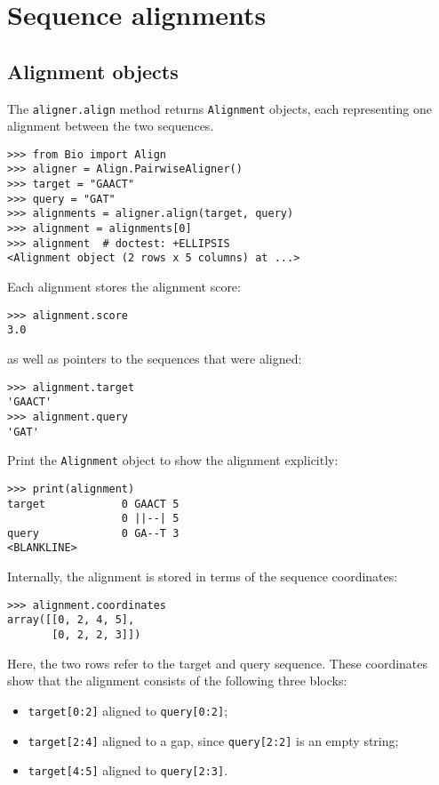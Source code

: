 \chapter{Sequence alignments}
\label{chapter:align}

\section{Alignment objects}
\label{sec:alignmentobject}

The \verb+aligner.align+ method returns \verb+Alignment+ objects, each representing one alignment between the two sequences.

\begin{verbatim}
>>> from Bio import Align
>>> aligner = Align.PairwiseAligner()
>>> target = "GAACT"
>>> query = "GAT"
>>> alignments = aligner.align(target, query)
>>> alignment = alignments[0]
>>> alignment  # doctest: +ELLIPSIS
<Alignment object (2 rows x 5 columns) at ...>
\end{verbatim}

Each alignment stores the alignment score:

\begin{verbatim}
>>> alignment.score
3.0
\end{verbatim}
as well as pointers to the sequences that were aligned:

\begin{verbatim}
>>> alignment.target
'GAACT'
>>> alignment.query
'GAT'
\end{verbatim}

Print the \verb+Alignment+ object to show the alignment explicitly:

\begin{verbatim}
>>> print(alignment)
target            0 GAACT 5
                  0 ||--| 5
query             0 GA--T 3
<BLANKLINE>
\end{verbatim}

Internally, the alignment is stored in terms of the sequence coordinates:

\begin{verbatim}
>>> alignment.coordinates
array([[0, 2, 4, 5],
       [0, 2, 2, 3]])
\end{verbatim}

Here, the two rows refer to the target and query sequence. These coordinates show that the alignment consists of the following three blocks:

\begin{itemize}
\item \verb+target[0:2]+ aligned to \verb+query[0:2]+;
\item \verb+target[2:4]+ aligned to a gap, since \verb+query[2:2]+ is an empty string;
\item \verb+target[4:5]+ aligned to \verb+query[2:3]+.
\end{itemize}

